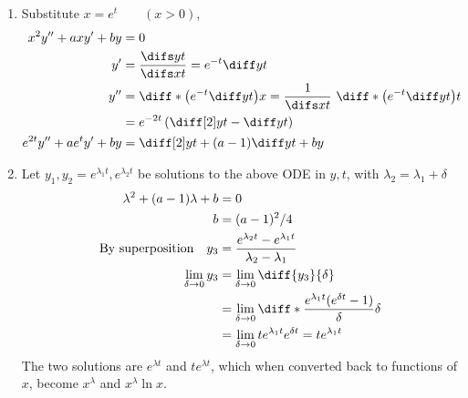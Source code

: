 \begin{enumerate}
\begin{enumerate}
              \item Substitute $ x = e^{t} \qquad (x>0)$,
                    \begin{align}
                        x^{2}y'' + axy' + by      & = 0                                \\
                        y'                        & = \frac{\difs yt}{\difs xt}
                        = e^{-t}\diff yt                                               \\
                        y''                       & = \diff* {\left( e^{-t}\diff
                            yt \right)}{x} = \frac{1}{\difs xt}\ \diff* {\left( e^{-t}
                        \diff yt \right)}{t}                                           \\
                                                  & = e^{-2t}\left(\diff[2] yt
                        - \diff yt  \right)                                            \\
                        e^{2t}y'' + ae^{t}y' + by & = \diff[2] yt + (a-1)\diff yt + by
                    \end{align}

              \item Let $y_{1}, y_{2} = e^{\lambda_{1} t}, e^{\lambda_{2} t}$ be
                    solutions to the above ODE in $ y, t $, with
                    $ \lambda_{2} = \lambda_{1} + \delta $
                    \begin{align}
                        \lambda^{2} + (a-1)\lambda + b
                                                 & = 0                       \\
                        b                        & = (a - 1)^{2} / 4         \\
                        \text{By superposition} \quad y_{3}
                                                 & = \frac{e^{\lambda_{2} t}
                        - e^{\lambda_{1} t}}{\lambda_{2} - \lambda_{1}}      \\
                        \lim_{\delta \to 0}y_{3} & = \lim_{\delta \to 0}
                        \diff {y_{3}}{\delta}                                \\
                                                 & =\lim_{\delta \to 0}
                        \diff*{\frac{e^{\lambda_{1}t}(e^{\delta t} - 1)}{\delta}}
                        {\delta}                                             \\
                                                 & = \lim_{\delta \to 0}
                        t e^{\lambda_{1}t}e^{\delta t} = te^{\lambda_{1}t}
                    \end{align}
                    The two solutions are $ e^{\lambda t} $ and $ te^{\lambda t} $,
                    which when converted back to functions of $ x $, become
                    $ x^{\lambda} $ and $ x^{\lambda} \ln x $.
          \end{enumerate}
\end{enumerate}